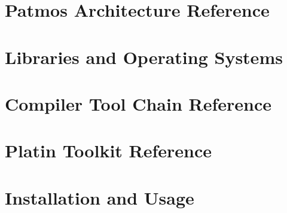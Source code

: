 \documentclass[11pt,twoside,a4paper]{report}
\begin{document}



\chapter{Patmos Architecture Reference}






\chapter{Libraries and Operating Systems}






\chapter{Compiler Tool Chain Reference}




\chapter{Platin Toolkit Reference}





\chapter{Installation and Usage}
\end{document}
